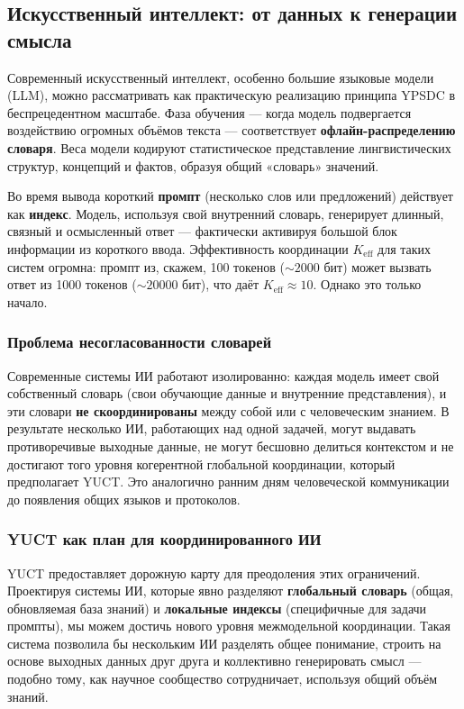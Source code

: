 \documentclass[12pt,a4paper]{article}
\theoremstyle{remark}
\newcommand{\Keff}{K_{\mathrm{eff}}}
\begin{document}
	\subsection{Искусственный интеллект: от данных к генерации смысла}
	
	Современный искусственный интеллект, особенно большие языковые модели (LLM), можно рассматривать как практическую реализацию принципа YPSDC в беспрецедентном масштабе. Фаза обучения — когда модель подвергается воздействию огромных объёмов текста — соответствует \textbf{офлайн-распределению словаря}. Веса модели кодируют статистическое представление лингвистических структур, концепций и фактов, образуя общий «словарь» значений.
	
	Во время вывода короткий \textbf{промпт} (несколько слов или предложений) действует как \textbf{индекс}. Модель, используя свой внутренний словарь, генерирует длинный, связный и осмысленный ответ — фактически активируя большой блок информации из короткого ввода. Эффективность координации $\Keff$ для таких систем огромна: промпт из, скажем, 100 токенов ($\sim 2000$ бит) может вызвать ответ из 1000 токенов ($\sim 20 000$ бит), что даёт $\Keff \approx 10$. Однако это только начало.
	
	\subsubsection{Проблема несогласованности словарей}
	
	Современные системы ИИ работают изолированно: каждая модель имеет свой собственный словарь (свои обучающие данные и внутренние представления), и эти словари \textbf{не скоординированы} между собой или с человеческим знанием. В результате несколько ИИ, работающих над одной задачей, могут выдавать противоречивые выходные данные, не могут бесшовно делиться контекстом и не достигают того уровня когерентной глобальной координации, который предполагает YUCT. Это аналогично ранним дням человеческой коммуникации до появления общих языков и протоколов.
	
	\subsubsection{YUCT как план для координированного ИИ}
	
	YUCT предоставляет дорожную карту для преодоления этих ограничений. Проектируя системы ИИ, которые явно разделяют \textbf{глобальный словарь} (общая, обновляемая база знаний) и \textbf{локальные индексы} (специфичные для задачи промпты), мы можем достичь нового уровня межмодельной координации. Такая система позволила бы нескольким ИИ разделять общее понимание, строить на основе выходных данных друг друга и коллективно генерировать смысл — подобно тому, как научное сообщество сотрудничает, используя общий объём знаний.
	
\end{document}
